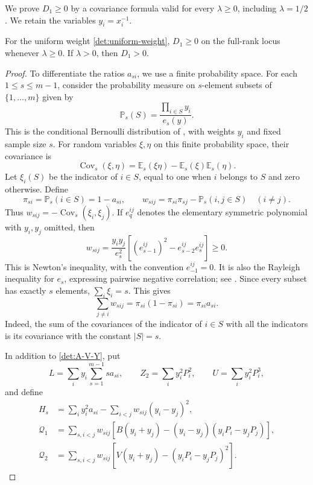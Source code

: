 We prove $D_1\geq0$ by a covariance formula valid for every
$\lambda\geq0$, including $\lambda=1/2$. We retain the variables
$y_i=x_i^{-1}$.
\begin{lemma}\label{det:second-positive}
For the uniform weight \eqref{det:uniform-weight}, $D_1\geq0$ on the
full-rank locus whenever $\lambda\geq0$. If $\lambda>0$, then $D_1>0$.
\end{lemma}

\begin{proof}
To differentiate the ratios $a_{si}$, we use a finite probability space.
For each $1\leq s\leq m-1$, consider the probability measure on
$s$-element subsets of $\{1,\ldots,m\}$ given by
\[
 \mathbb P_s(S)=\frac{\prod_{i\in S}y_i}{e_s(y)}.
\]
This is the conditional Bernoulli distribution of
\cite[pp.~876--877, equations~(3) and~(6); Section~3.2, p.~883]{ChenLiu97}, with weights
\(y_i\) and fixed sample size \(s\).
For random variables \(\xi,\eta\) on this finite probability space,
their covariance is
\[
 \operatorname{Cov}_s(\xi,\eta)
 =\mathbb E_s(\xi\eta)-\mathbb E_s(\xi)\mathbb E_s(\eta).
\]
Let \(\xi_i(S)\) be the indicator of \(i\in S\), equal to one
when \(i\) belongs to \(S\) and zero otherwise.
Define
\[
 \pi_{si}=\mathbb P_s(i\in S)=1-a_{si},\qquad
 w_{sij}=\pi_{si}\pi_{sj}-\mathbb P_s(i,j\in S)\quad(i\ne j).
\]
Thus \(w_{sij}=-\operatorname{Cov}_s(\xi_i,\xi_j)\).
If $e_q^{ij}$ denotes the elementary symmetric polynomial with $y_i,y_j$
omitted, then
\begin{equation}\label{det:covariance-positive}
 w_{sij}=\frac{y_iy_j}{e_s^2}
       \left[(e_{s-1}^{ij})^2-e_{s-2}^{ij}e_s^{ij}\right]\geq0.
\end{equation}
This is Newton's inequality, with the convention $e_{-1}^{ij}=0$.
It is also the Rayleigh inequality for \(e_s\), expressing pairwise
negative correlation; see
\cite[Definitions~2.3 and~2.5]{BorceaBrandenLiggett09}.
Since every subset has exactly \(s\) elements,
\(\sum_i\xi_i=s\).  This gives
\begin{equation}\label{det:covariance-rowsum}
 \sum_{j\ne i}w_{sij}=\pi_{si}(1-\pi_{si})=\pi_{si}a_{si}.
\end{equation}
Indeed, the sum of the covariances of the indicator of $i\in S$ with
all the indicators is its covariance with the constant $|S|=s$.

In addition to \eqref{det:A-V-Y}, put
\[
 L=\sum_i y_i\sum_{s=1}^{m-1}s a_{si},\qquad Z_2=\sum_i y_i^2P_i^2,
 \qquad U=\sum_i y_i^2P_i^3,
\]
and define
\begin{align}
 H_s&=\sum_i y_i^2a_{si}
       -\sum_{i<j}w_{sij}(y_i-y_j)^2,
 \label{det:H-positive}\\
 \mathcal Q_1&=\sum_{s,i<j}w_{sij}
       \left[B(y_i+y_j)-(y_i-y_j)(y_iP_i-y_jP_j)\right],
 \label{det:Q1}\\
 \mathcal Q_2&=\sum_{s,i<j}w_{sij}
       \left[V(y_i+y_j)-(y_iP_i-y_jP_j)^2\right].
 \label{det:Q2}
\end{align}


\end{proof}
